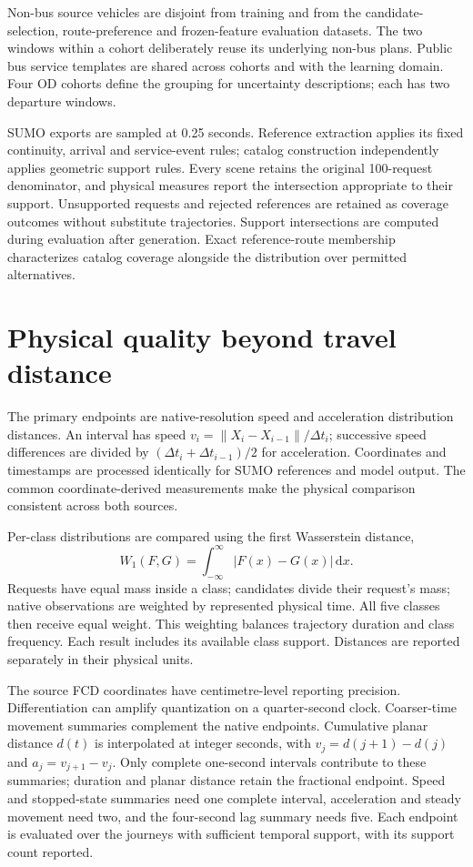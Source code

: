 Non-bus source vehicles are disjoint from training and from the candidate-selection, route-preference and frozen-feature evaluation datasets. The two windows within a cohort deliberately reuse its underlying non-bus plans. Public bus service templates are shared across cohorts and with the learning domain. Four OD cohorts define the grouping for uncertainty descriptions; each has two departure windows.

SUMO exports are sampled at 0.25 seconds. Reference extraction applies its fixed continuity, arrival and service-event rules; catalog construction independently applies geometric support rules. Every scene retains the original 100-request denominator, and physical measures report the intersection appropriate to their support. Unsupported requests and rejected references are retained as coverage outcomes without substitute trajectories. Support intersections are computed during evaluation after generation. Exact reference-route membership characterizes catalog coverage alongside the distribution over permitted alternatives.

\section{Physical quality beyond travel distance}
The primary endpoints are native-resolution speed and acceleration distribution distances. An interval has speed $v_i=\|X_i-X_{i-1}\|/\Delta t_i$; successive speed differences are divided by $(\Delta t_i+\Delta t_{i-1})/2$ for acceleration. Coordinates and timestamps are processed identically for SUMO references and model output. The common coordinate-derived measurements make the physical comparison consistent across both sources.

Per-class distributions are compared using the first Wasserstein distance,
\begin{equation}
 W_1(F,G)=\int_{-\infty}^{\infty}|F(x)-G(x)|\,\mathrm dx.
 \label{eq:native-wasserstein}
\end{equation}
Requests have equal mass inside a class; candidates divide their request's mass; native observations are weighted by represented physical time. All five classes then receive equal weight. This weighting balances trajectory duration and class frequency. Each result includes its available class support. Distances are reported separately in their physical units.

The source FCD coordinates have centimetre-level reporting precision. Differentiation can amplify quantization on a quarter-second clock. Coarser-time movement summaries complement the native endpoints. Cumulative planar distance $d(t)$ is interpolated at integer seconds, with $v_j=d(j+1)-d(j)$ and $a_j=v_{j+1}-v_j$. Only complete one-second intervals contribute to these summaries; duration and planar distance retain the fractional endpoint. Speed and stopped-state summaries need one complete interval, acceleration and steady movement need two, and the four-second lag summary needs five. Each endpoint is evaluated over the journeys with sufficient temporal support, with its support count reported.

